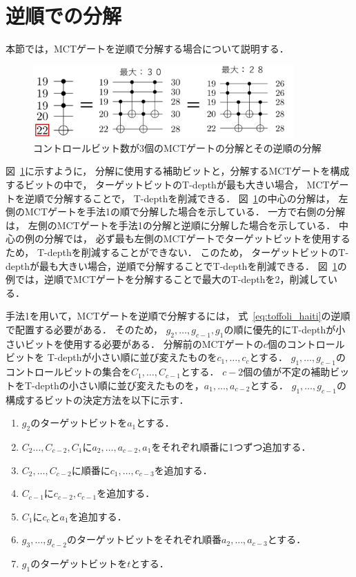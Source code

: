 \section{逆順での分解}
本節では，MCTゲートを逆順で分解する場合について説明する．
\begin{figure}[tbp]
  \centering
  \includegraphics[width=10cm]{img/reverse_mct.pdf}
  \caption{コントロールビット数が3個のMCTゲートの分解とその逆順の分解}
  \label{reverse}
\end{figure}
\par
図~\ref{reverse}に示すように，
分解に使用する補助ビットと，分解するMCTゲートを構成するビットの中で，
ターゲットビットのT-depthが最も大きい場合，
MCTゲートを逆順で分解することで，
T-depthを削減できる．
図~\ref{reverse}の中心の分解は，
左側のMCTゲートを手法1の順で分解した場合を示している．
一方で右側の分解は，
左側のMCTゲートを手法1の分解と逆順に分解した場合を示している．
中心の例の分解では，
必ず最も左側のMCTゲートでターゲットビットを使用するため，
T-depthを削減することができない．
このため，
ターゲットビットのT-depthが最も大きい場合，逆順で分解することでT-depthを削減できる．
図~\ref{reverse}の例では，逆順でMCTゲートを分解することで最大のT-depthを2，削減している．
\par
手法1を用いて，MCTゲートを逆順で分解するには，
式~\ref{eq:toffoli_haiti}の逆順で配置する必要がある．
そのため，
$g_{2},\dots ,g_{c-1}, g_{1}$の順に優先的にT-depthが小さいビットを使用する必要がある．
分解前のMCTゲートの$c$個のコントロールビットを
T-depthが小さい順に並び変えたものを$c_{1},\dots, c_{c}$とする．
$g_{1},\dots, g_{c-1}$のコントロールビットの集合を$C_{1},\dots, C_{c-1}$とする．
$c-2$個の値が不定の補助ビットをT-depthの小さい順に並び変えたものを，$a_{1},\dots ,a_{c-2}$とする．
$g_{1},\dots ,g_{c-1}$の構成するビットの決定方法を以下に示す．
\begin{enumerate}[手順1]
  \item $g_{2}$のターゲットビットを$a_{1}$とする．
  \item $C_{2}\dots, C_{c-2}, C_{1}$に$a_{2},\dots, a_{c-2}, a_{1}$をそれぞれ順番に1つずつ追加する．
  \item $C_{2},\dots ,C_{c-2}$に順番に$c_{1},\dots ,c_{c-3}$を追加する．
  \item $C_{c-1}$に$c_{c-2}, c_{c-1}$を追加する．
  \item $C_{1}$に$c_{c}$と$a_{1}$を追加する．
  \item $g_{3},\dots, g_{c-2}$のターゲットビットをそれぞれ順番$a_{2}, \dots , a_{c-3}$とする．
  \item $g_{1}$のターゲットビットを$t$とする．
\end{enumerate}
